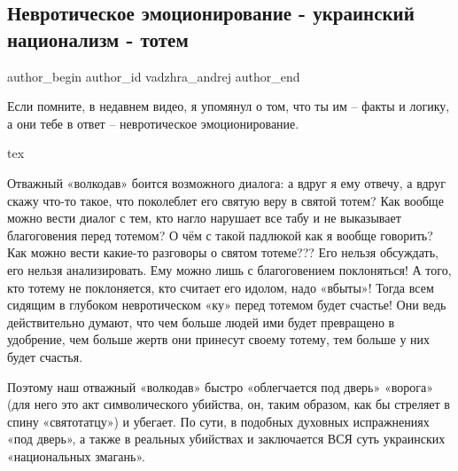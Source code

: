  
 
 
 
 
 
\subsection{Невротическое эмоционирование - украинский национализм - тотем}
\label{sec:03_08_2021.fb.vadzhra_andrej.1.totem_ukrainstvo}
 
\ifcmt
 author_begin
   author_id vadzhra_andrej
 author_end
\fi

Если помните, в недавнем видео, я упомянул о том, что ты им – факты и логику, а
они тебе в ответ – невротическое эмоционирование.

\ifcmt
	tex 
\fi

Отважный «волкодав» боится возможного диалога: а вдруг  я ему отвечу, а вдруг
скажу что-то такое, что поколеблет его святую веру в святой тотем? Как вообще
можно вести диалог с тем, кто нагло нарушает все табу и не выказывает
благоговения перед тотемом? О чём с такой падлюкой как я вообще говорить? Как
можно вести какие-то разговоры о святом тотеме??? Его нельзя обсуждать, его
нельзя анализировать. Ему можно лишь с благоговением поклоняться! А того, кто
тотему не поклоняется, кто считает его идолом, надо «вбыты»! Тогда всем сидящим
в глубоком невротическом «ку» перед тотемом будет счастье! Они ведь
действительно думают, что чем больше людей ими будет превращено в удобрение,
чем больше жертв они принесут своему тотему, тем больше у них будет счастья.

Поэтому наш отважный «волкодав» быстро «облегчается под дверь» «ворога» (для
него это акт символического убийства, он, таким образом, как бы стреляет в
спину «святотатцу») и убегает. По сути, в подобных духовных испражнениях «под
дверь», а также в реальных убийствах и заключается ВСЯ суть украинских
«национальных змагань».

